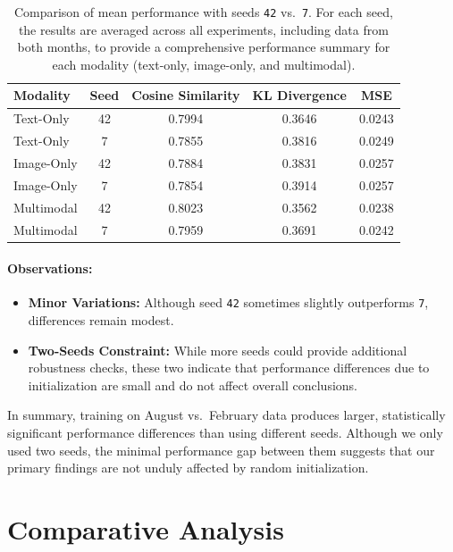 \begin{table}[ht]
    \centering
    \begin{tabular}{lcccc}
    \toprule
    \textbf{Modality} & \textbf{Seed} & \textbf{Cosine Similarity} & \textbf{KL Divergence} & \textbf{MSE} \\
    \midrule
    Text-Only & 42 & 0.7994 &  0.3646 & 0.0243 \\
    Text-Only & 7 & 0.7855 &  0.3816 & 0.0249 \\
    \midrule
    Image-Only & 42 & 0.7884 & 0.3831 & 0.0257 \\
    Image-Only & 7 & 0.7854 & 0.3914 & 0.0257 \\
    \midrule
    Multimodal & 42 & 0.8023 & 0.3562 & 0.0238 \\
    Multimodal & 7 & 0.7959 & 0.3691 & 0.0242 \\
    \bottomrule
    \end{tabular}%
    \caption{Comparison of mean performance with seeds \texttt{42} vs.\ \texttt{7}.
    For each seed, the results are averaged across all experiments, including data from both months, to provide a comprehensive performance summary for each modality (text-only, image-only, and multimodal).}
    \label{tab:dataset_comparison_seed}
\end{table}




\paragraph{Observations:}
\begin{itemize}
    \item \textbf{Minor Variations:} Although seed \texttt{42} sometimes slightly outperforms \texttt{7}, differences remain modest.
    \item \textbf{Two-Seeds Constraint:} While more seeds could provide additional robustness checks, these two indicate that performance differences due to initialization are small and do not affect overall conclusions.
\end{itemize}

\noindent
In summary, training on August vs.\ February data produces larger, statistically significant performance differences than using different seeds. Although we only used two seeds, the minimal performance gap between them suggests that our primary findings are not unduly affected by random initialization.


\section{Comparative Analysis}

